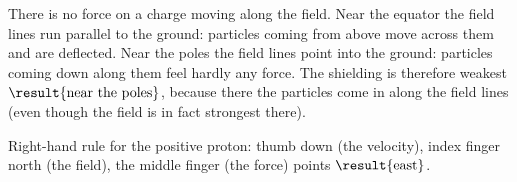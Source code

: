 \begin{abcliste}
\abc There is no force on a charge moving along the field. Near the equator the field lines run parallel to the ground: particles coming from above move across them and are deflected. Near the poles the field lines point into the ground: particles coming down along them feel hardly any force. The shielding is therefore weakest $\result{\text{near the poles}}$, because there the particles come in along the field lines (even though the field is in fact strongest there).

\abc Right-hand rule for the positive proton: thumb down (the velocity), index finger north (the field), the middle finger (the force) points $\result{\text{east}}$.
\end{abcliste}
